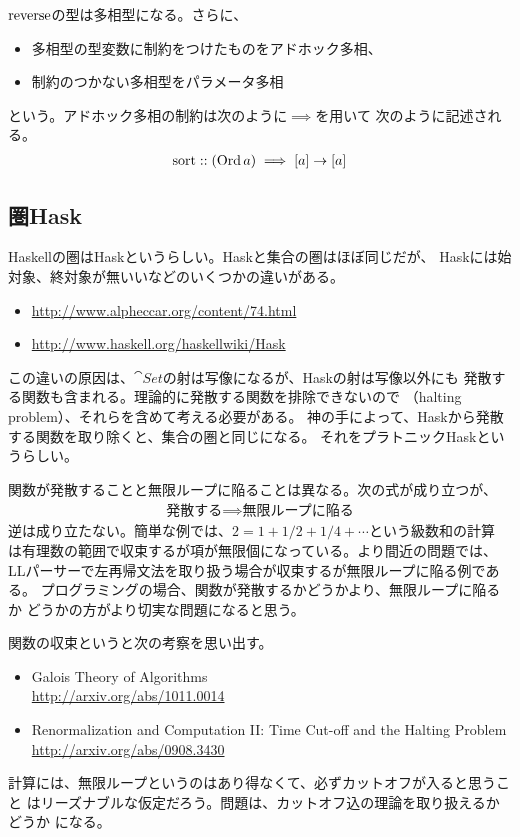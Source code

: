 {\begin{description}
		$\mathinner{\operatorname{reverse}}$の型は多相型になる。さらに、
		\begin{itemize}\setlength{\itemsep}{-1mm} %
			\item 多相型の型変数に制約をつけたものをアドホック多相、
			\item 制約のつかない多相型をパラメータ多相
		\end{itemize} %
		という。アドホック多相の制約は次のように$\implies$を用いて
		次のように記述される。
		\begin{equation*}\begin{split}
			\mathinner{\operatorname{sort}} :: (\mathinner{\operatorname{Ord}} a) \implies [a]\to [a]
		\end{split}\end{equation*}
	\end{description} %

\subsection{圏Hask}\label{s2:圏Hask} %
	Haskellの圏はHaskというらしい。Haskと集合の圏はほぼ同じだが、
	Haskには始対象、終対象が無いいなどのいくつかの違いがある。
	\begin{itemize}\setlength{\itemsep}{-1mm} %
		\item \url{http://www.alpheccar.org/content/74.html}
		\item \url{http://www.haskell.org/haskellwiki/Hask}
	\end{itemize} %
	この違いの原因は、$\cat{Set}$の射は写像になるが、Haskの射は写像以外にも
	発散する関数も含まれる。理論的に発散する関数を排除できないので
	（halting problem）、それらを含めて考える必要がある。
	神の手によって、Haskから発散する関数を取り除くと、集合の圏と同じになる。
	それをプラトニックHaskというらしい。

	関数が発散することと無限ループに陥ることは異なる。次の式が成り立つが、
	\begin{equation*}\begin{split}
		\text{発散する} \implies \text{無限ループに陥る}
	\end{split}\end{equation*}
	逆は成り立たない。簡単な例では、$2=1+1/2+1/4+\cdots$という級数和の計算
	は有理数の範囲で収束するが項が無限個になっている。より間近の問題では、
	LLパーサーで左再帰文法を取り扱う場合が収束するが無限ループに陥る例である。
	プログラミングの場合、関数が発散するかどうかより、無限ループに陥るか
	どうかの方がより切実な問題になると思う。

	関数の収束というと次の考察を思い出す。
	\begin{itemize}\setlength{\itemsep}{-1mm} %
		\item Galois Theory of Algorithms \\
		\url{http://arxiv.org/abs/1011.0014}
		\item Renormalization and Computation II: Time Cut-off and the Halting Problem \\
		\url{http://arxiv.org/abs/0908.3430}
	\end{itemize} %
	計算には、無限ループというのはあり得なくて、必ずカットオフが入ると思うこと
	はリーズナブルな仮定だろう。問題は、カットオフ込の理論を取り扱えるかどうか
	になる。
}

